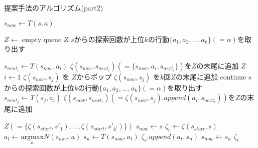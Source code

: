 \begin{algorithm}
    
    \caption{提案手法のアルゴリズム(part2)}
    \label{alg:myalg-2}
    \begin{algorithmic}[1]    
    \scriptsize   
           \State $s_{now} \gets T(s, a)$
           
           \State $Z \gets $ empty queue
             \Return  $Z$
            \EndIf
           \State $s$からの探索回数が上位$k$の行動$\{a_1, a_2, ..., a_{k}\}(=\alpha)$を取り出す
             
             \State $s_{{next}_i} \gets T(s_{now}, a_i)$
             \State $\zeta(s_{now},s_{{next}_i})(=\{s_{now}, a_i, s_{{next}_i}\})$を$Z$の末尾に追加
           \EndFor
             \Return $Z$
           \EndIf
           \State $i \gets 1$
                    \State $\zeta(s_{now}, s_{j})$ を $Z$からポップ
                        \State $\zeta(s_{now}, s_{j})$ を$k$回$Z$の末尾に追加
                        \State continue
                    \EndIf
                    \State $s$からの探索回数が上位$k$の行動$\{a_1, a_2, ..., a_{k}\}(=\alpha)$を取り出す
                        \State $s_{{next}_j} \gets T(s_{j}, a_i)$
                        \State $\zeta(s_{now},s_{{next}_i})(=\zeta(s_{now}, s_{j}).append({a_i, s_{{next}_i}}))$を$Z$の末尾に追加
                    \EndFor
                    
                \EndFor     
           \EndWhile
           \Return $Z(=\{\zeta(s_{start}, {s'}_1), ..., \zeta(s_{start}, {s'}_{k^l})\})$
        \EndFunction
        \State $s_{now} \gets s$
        \State $\zeta_r \gets \zeta(s_{start}, s)$
            \State $a_t \gets {\underset{a}{\textrm{argmax}}} N(s_{now}, a)$
            \State $s_n \gets T(s_{now}, a_t)$
            \State $\zeta_r.append({a_t, s_n})$
            \State $s_{now} \gets s_n$
        \EndWhile
        \Return $\zeta_r$
        \EndFunction
       
        
    \end{algorithmic}
\end{algorithm}

